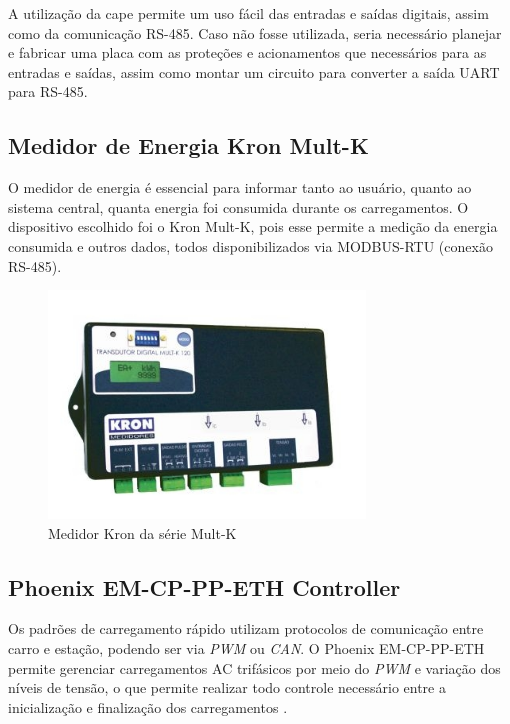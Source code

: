       A utilização da cape permite um uso fácil das entradas e saídas digitais, assim como da comunicação RS-485. Caso não fosse utilizada, seria necessário planejar e fabricar uma placa com as proteções e acionamentos que necessários para as entradas e saídas, assim como montar um circuito para converter a saída \ac{UART} para RS-485. 

    \subsection{Medidor de Energia Kron Mult-K}
    \label{methodology:devices:kron}

      O medidor de energia é essencial para informar tanto ao usuário, quanto ao sistema central, quanta energia foi consumida durante os carregamentos. O dispositivo escolhido foi o Kron Mult-K, pois esse permite a medição da energia consumida e outros dados, todos disponibilizados via MODBUS-RTU (conexão RS-485).

      \begin{figure}[H]
        \begin{center}
          \includegraphics[width=0.75\textwidth,natwidth=400,natheight=288]{assets/images/devices-kron.jpg}
          \caption{Medidor Kron da série Mult-K}
          \label{fig:kron}
        \end{center}
      \end{figure}

    \subsection{Phoenix EM-CP-PP-ETH Controller}
    \label{methodology:devices:phoenix}

      Os padrões de carregamento rápido utilizam protocolos de comunicação entre carro e estação, podendo ser via \textit{\ac{PWM}} ou \textit{\ac{CAN}}. O Phoenix EM-CP-PP-ETH permite gerenciar carregamentos AC trifásicos por meio do \textit{\ac{PWM}} e variação dos níveis de tensão, o que permite realizar todo controle necessário entre a inicialização e finalização dos carregamentos \cite{phoenix}. 

